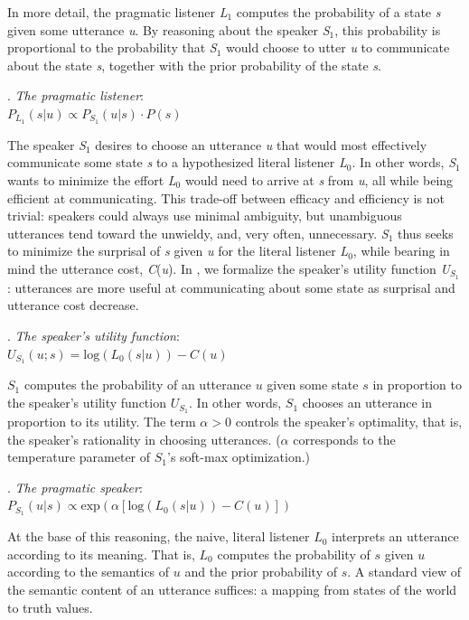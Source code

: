 \documentclass[linguex]{sp}
\begin{document}
In more detail, the pragmatic listener \emph{L}$_{1}$ computes the probability of a state \emph{s} given some utterance \emph{u}. By reasoning about the speaker \emph{S}$_{1}$, this probability is proportional to the probability that \emph{S}$_{1}$ would choose to utter \emph{u} to communicate about the state \emph{s}, together with the prior probability of the state \emph{s}.

\ex. \emph{The pragmatic listener}:\\
$P_{L_{1}}(s|u) \propto P_{S_{1}}(u|s) \cdot P(s)$

The speaker \emph{S}$_{1}$ desires to choose an utterance \emph{u} that would most effectively communicate some state \emph{s} to a hypothesized literal listener \emph{L}$_{0}$.  In other words, \emph{S}$_{1}$ wants to minimize the effort \emph{L}$_{0}$ would need to arrive at \emph{s} from \emph{u}, all while being efficient at communicating. This trade-off between efficacy and efficiency is not trivial: speakers could always use minimal ambiguity, but unambiguous utterances tend toward the unwieldy, and, very often, unnecessary. \emph{S}$_{1}$ thus seeks to minimize the surprisal of \emph{s} given \emph{u} for the literal listener \emph{L}$_{0}$, while bearing in mind the utterance cost, \emph{C}(\emph{u}). In \Next, we formalize the speaker's utility function \emph{U}$_{S_{1}}$: utterances are more useful at communicating about some state as surprisal and utterance cost decrease.

\ex. \emph{The speaker's utility function}:\\
$U_{S_{1}}(u;s) = \textrm{log}(L_{0}(s|u)) - C(u)$

$S_{1}$ computes the probability of an utterance $u$ given some state $s$ in proportion to the speaker's utility function $U_{S_{1}}$. In other words, $S_{1}$ chooses an utterance in proportion to its utility. The term \mbox{$\alpha > 0$} controls the speaker's optimality, that is, the speaker's rationality in choosing utterances. ($\alpha$ corresponds to the temperature parameter of $S_{1}$'s soft-max optimization.)

\ex. \emph{The pragmatic speaker}:\\
$P_{S_{1}}(u|s) \propto \textrm{exp}(\alpha[\textrm{log}(L_{0}(s|u)) - C(u)])$

At the base of this reasoning, the naive, literal listener $L_{0}$ interprets an utterance according to its meaning. That is, $L_{0}$ computes the probability of $s$ given $u$ according to the semantics of $u$ and the prior probability of $s$. A standard view of the semantic content of an utterance suffices: a mapping from states of the world to truth values.
\end{document}
